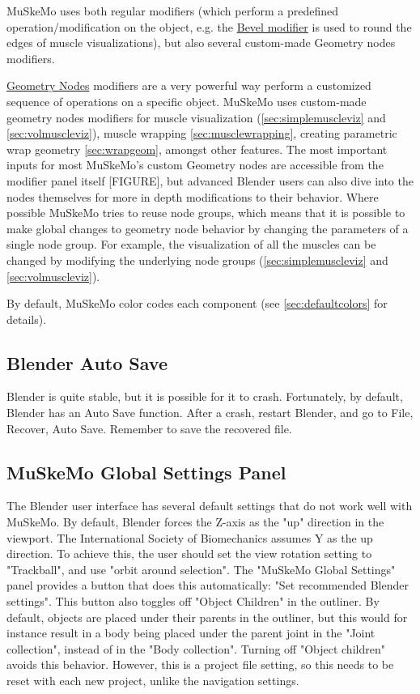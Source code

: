 \documentclass{article}
\begin{document}
MuSkeMo uses both regular modifiers (which perform a predefined operation/modification on the object, e.g. the \href{https://docs.blender.org/manual/en/latest/modeling/modifiers/generate/bevel.html}{Bevel modifier} is used to round the edges of muscle visualizations), but also several custom-made Geometry nodes modifiers.

\href{https://docs.blender.org/manual/en/latest/modeling/geometry_nodes/index.html}{Geometry Nodes} modifiers are a very powerful way perform a customized sequence of operations on a specific object. MuSkeMo uses custom-made geometry nodes modifiers for muscle visualization (\ref{sec:simplemuscleviz} and \ref{sec:volmuscleviz}), muscle wrapping \ref{sec:musclewrapping}, creating parametric wrap geometry \ref{sec:wrapgeom}, amongst other features. The most important inputs for most MuSkeMo's custom Geometry nodes are accessible from the modifier panel itself [FIGURE], but advanced Blender users can also dive into the nodes themselves for more in depth modifications to their behavior. Where possible MuSkeMo tries to reuse node groups, which means that it is possible to make global changes to geometry node behavior by changing the parameters of a single node group. For example, the visualization of all the muscles can be changed by modifying the underlying node groups (\ref{sec:simplemuscleviz} and \ref{sec:volmuscleviz}).

By default, MuSkeMo color codes each component (see \ref{sec:defaultcolors} for details).


\subsection{Blender Auto Save}

Blender is quite stable, but it is possible for it to crash. Fortunately, by default, Blender has an Auto Save function. After a crash, restart Blender, and go to File, Recover, Auto Save. Remember to save the recovered file.

\subsection{MuSkeMo Global Settings Panel}
The Blender user interface has several default settings that do not work well with MuSkeMo. By default, Blender forces the Z-axis as the "up" direction in the viewport. The International Society of Biomechanics assumes Y as the up direction. To achieve this, the user should set the view rotation setting to "Trackball", and use "orbit around selection". The "MuSkeMo Global Settings" panel provides a button that does this automatically: "Set recommended Blender settings". This button also toggles off "Object Children" in the outliner. By default, objects are placed under their parents in the outliner, but this would for instance result in a body being placed under the parent joint in the "Joint collection", instead of in the "Body collection". Turning off "Object children" avoids this behavior. However, this is a project file setting, so this needs to be reset with each new project, unlike the navigation settings. 
\end{document}
